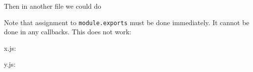 \begin{Shaded}
\begin{Highlighting}[]
 \NormalTok{;}

 \NormalTok{= } 

\NormalTok{() \{}
  \NormalTok{(}\NormalTok{);}
\NormalTok{\}, }\NormalTok{);}
\end{Highlighting}
\end{Shaded}

Then in another file we could do

\begin{Shaded}
\begin{Highlighting}[]
 \NormalTok{);}
\NormalTok{(}\NormalTok{, }\NormalTok{() \{}
  \NormalTok{(}\NormalTok{);}
\NormalTok{\});}
\end{Highlighting}
\end{Shaded}

Note that assignment to \texttt{module.exports} must be done
immediately. It cannot be done in any callbacks. This does not work:

x.js:

\begin{Shaded}
\begin{Highlighting}[]
\NormalTok{() \{}
   \NormalTok{= \{ }\NormalTok{: } \NormalTok{\};}
\NormalTok{\}, }\NormalTok{);}
\end{Highlighting}
\end{Shaded}

y.js:

\begin{Shaded}
\begin{Highlighting}[]
 \NormalTok{);}
\NormalTok{(}\NormalTok{);}
\end{Highlighting}
\end{Shaded}

